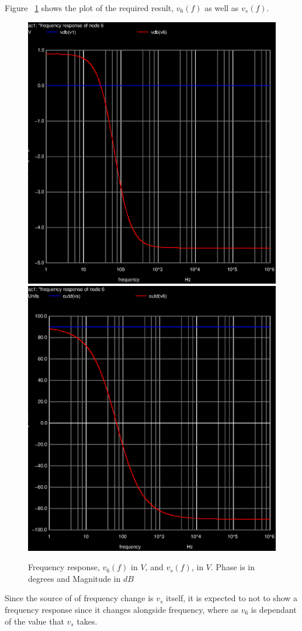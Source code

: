 Figure ~\ref{fig:simulation_5} shows the plot of the required result, $v_6(f)$ as well as $v_s(f)$.

\begin{figure}[!ht] \centering
\caption{Frequency response, $v_{6}(f)$ in $V$, and $v_s(f)$, in $V$. Phase is in degrees and Magnitude in $dB$}
\includegraphics[width=0.4\linewidth]{acm.eps}
\includegraphics[width=0.4\linewidth]{acm2.eps}
\label{fig:simulation_5}
\end{figure}

Since the source of of frequency change is $v_s$ itself, it is expected to not to show a frequency response since it changes alongside frequency, where as $v_6$ is dependant of the value that $v_s$ takes. 







